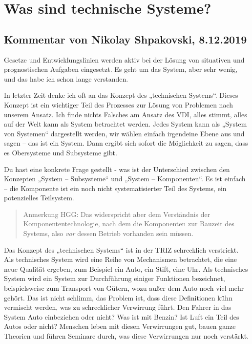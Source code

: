 \documentclass[11pt,a4paper]{article}
\begin{document}
\section{Was sind technische Systeme?}


\subsection{Kommentar von Nikolay Shpakovski, 8.12.2019}

Gesetze und Entwicklungslinien werden aktiv bei der Lösung von situativen und
prognostischen Aufgaben eingesetzt. Es geht um das System, aber sehr wenig,
und das habe ich schon lange verstanden.

In letzter Zeit denke ich oft an das Konzept des „technischen Systems“. Dieses
Konzept ist ein wichtiger Teil des Prozesses zur Lösung von Problemen nach
unserem Ansatz. Ich finde nichts Falsches am Ansatz des VDI, alles stimmt,
alles auf der Welt kann als System betrachtet werden.  Jedes System kann als
„System von Systemen“ dargestellt werden, wir wählen einfach irgendeine Ebene
aus und sagen -- das ist ein System.  Dann ergibt sich sofort die Möglichkeit
zu sagen, dass es Obersysteme und Subsysteme gibt.

Du hast eine konkrete Frage gestellt - was ist der Unterschied zwischen den
Konzepten „System -- Subsysteme“ und „System -- Komponenten“. Es ist einfach
-- die Komponente ist ein noch nicht systematisierter Teil des Systems, ein
potenzielles Teilsystem.
\begin{quote}
  Anmerkung HGG: Das widerspricht aber dem Verständnis der
  Komponententechnologie, nach dem die Komponenten zur Bauzeit des Systems,
  also \emph{vor} dessen Betrieb vorhanden sein müssen.
\end{quote}

Das Konzept des „technischen Systems“ ist in der TRIZ schrecklich verstrickt.
Als technisches System wird eine Reihe von Mechanismen betrachtet, die eine
neue Qualität ergeben, zum Beispiel ein Auto, ein Stift, eine Uhr. Als
technisches System wird ein System zur Durchführung einiger Funktionen
bezeichnet, beispielsweise zum Transport von Gütern, wozu außer dem Auto noch
viel mehr gehört. Das ist nicht schlimm, das Problem ist, dass diese
Definitionen kühn vermischt werden, was zu schrecklicher Verwirrung führt.
Den Fahrer in das System Auto einbeziehen oder nicht? Was ist mit Benzin? Ist
Luft ein Teil des Autos oder nicht? Menschen leben mit diesen Verwirrungen
gut, bauen ganze Theorien und führen Seminare durch, was diese Verwirrungen
nur noch verstärkt.
\end{document}
